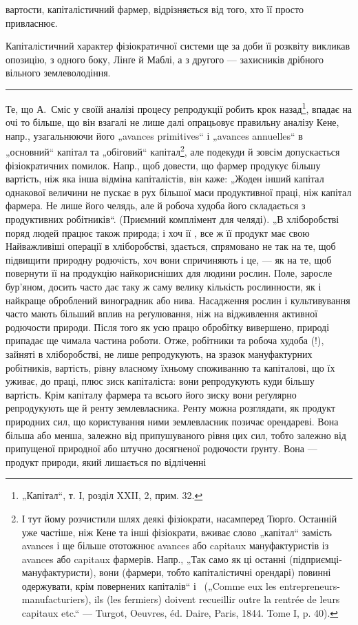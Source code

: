 \parcont{}  %
вартости, капіталістичний фармер, відрізняється від того, хто її просто
привласнює.

Капіталістичний характер фізіократичної системи ще за доби її розквіту
викликав опозицію, з одного боку, Лінґе й Маблі, а з другого —
захисників дрібного вільного землеволодіння.
\pfbreak
Те, що А.~Сміс у своїй аналізі процесу репродукції робить крок
назад\footnote{
„Капітал“, т. І, розділ XXII, 2, прим. 32.
}, впадає на очі то більше, що він взагалі не лише далі опрацьовує
правильну аналізу Кене, напр., узагальнюючи його „avances primitives“
і „avances annuelles“ в „основний“ капітал та „обіговий“
капітал\footnote{
І тут йому розчистили шлях деякі фізіократи, насамперед Тюрґо. Останній
уже частіше, ніж Кене та інші фізіократи, вживає слово „капітал“ замість avances
і ще більше ототожнює avances або capitaux мануфактуристів із avances або
capitaux фармерів. Напр., „Так само як ці останні (підприємці-мануфактуристи),
вони (фармери, тобто капіталістичні орендарі) повинні одержувати, крім повернених
капіталів“ і~ („Comme eux les entrepreneurs-manufacturiers), ils (les fermiers)
doivent recueillir outre la rentrée de leurs capitaux etc.“ — Turgot, Oeuvres, éd.
Daire, Paris, 1844. Tome I, p. 40).
}, але подекуди й зовсім допускається фізіократичних помилок.
Напр., щоб довести, що фармер продукує більшу вартість, ніж яка інша
відміна капіталістів, він каже: „Жоден інший капітал однакової величини
не пускає в рух більшої маси продуктивної праці, ніж капітал фармера.
Не лише його челядь, але й робоча худоба його складається з продуктивних
робітників“. (Приємний комплімент для челяді). „В хліборобстві
поряд людей працює також природа; і хоч її , все ж її продукт має свою 
Найважливіші операції в хліборобстві, здається, спрямовано не так на те,
щоб підвищити природну родючість, хоч вони спричиняють і це, — як
на те, щоб повернути її на продукцію найкорисніших для людини рослин.
Поле, заросле бур’яном, досить часто дає таку ж саму велику
кількість рослинности, як і найкраще оброблений виноградник або
нива. Насадження рослин і культивування часто мають більший вплив на
реґулювання, ніж на відживлення активної родючости природи. Після
того як усю працю обробітку вивершено, природі припадає ще чимала
частина роботи. Отже, робітники та робоча худоба (!), зайняті в хліборобстві,
не лише репродукують, на зразок мануфактурних робітників,
вартість, рівну власному їхньому споживанню та капіталові, що їх уживає,
до праці, плюс зиск капіталіста: вони репродукують куди більшу вартість.
Крім капіталу фармера та всього його зиску вони реґулярно репродукують
ще й ренту землевласника. Ренту можна розглядати, як продукт
природних сил, що користування ними землевласник позичає орендареві.
Вона більша або менша, залежно від припушуваного рівня цих сил,
тобто залежно від припущеної природної або штучно досягненої родючости
ґрунту. Вона — продукт природи, який лишається по відліченні
\parbreak{}  %

